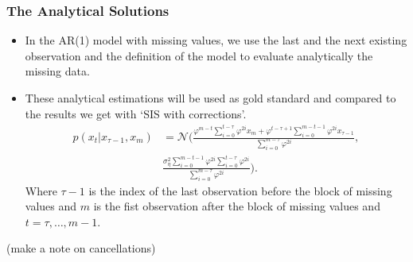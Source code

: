 \documentclass[9pt, xcolor={dvipsnames,svgnames,table}]{beamer}
\begin{document}
\begin{frame}
    \frametitle{The Analytical Solutions}
    \begin{itemize}
        \item In the AR(1) model with missing values, we use the last and the next existing observation and the definition of the model to evaluate analytically the missing data.
        \item These analytical estimations will be used as gold standard and compared to the results we get with `SIS with corrections'.
        \begin{align*}
            p(x_t | x_{\tau-1}, x_{m}) &= \mathcal{N} \Bigg(\frac{\varphi^{m-t} \sum_{i=0}^{t-\tau} \varphi^{2i} x_{m} + \varphi^{t-\tau+1} \sum_{i=0}^{m-t-1} \varphi^{2i} x_{\tau-1}}{\sum_{i=0}^{m-\tau} \varphi^{2i}}, \\
        & \frac{\sigma^2_\eta \sum_{i=0}^{m-t-1} \varphi^{2i} \sum_{i=0}^{t-\tau} \varphi^{2i}}{\sum_{i=0}^{m-\tau} \varphi^{2i}} \Bigg).
        \end{align*}
        Where $\tau-1$ is the index of the last observation before the block of missing values and $m$ is the fist observation after the block of missing values and $t = \tau, \dots, m-1$.
    \end{itemize}
    (make a note on cancellations)
\end{frame}
\end{document}

